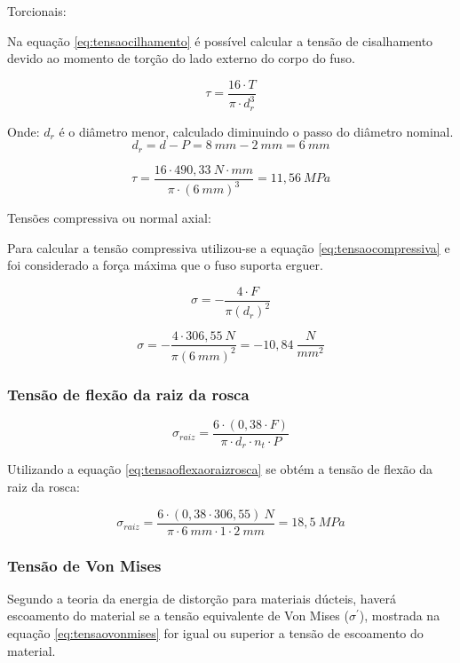 Torcionais:

Na equação \ref{eq:tensaocilhamento} é possível calcular a tensão de cisalhamento devido 
ao momento de torção do lado externo do corpo do fuso. 

\begin{equation}\label{eq:tensaocilhamento}
\tau = \frac{16 \cdot T}{\pi \cdot d_{r}^{3}}
\end{equation}

Onde:
$d_{r}$ é o diâmetro menor, calculado diminuindo o passo do diâmetro nominal.
$$d_{r} = d - P = 8~mm - 2~mm = 6~mm$$

$$\tau = \frac{16 \cdot 490,33~N \cdot mm}{\pi \cdot (6~mm)^{3}} = 11,56~MPa$$

Tensões compressiva ou normal axial:

Para calcular a tensão compressiva utilizou-se a equação \ref{eq:tensaocompressiva} e 
foi considerado a força máxima que o fuso suporta erguer.

\begin{equation}\label{eq:tensaocompressiva}
\sigma = - \frac{4 \cdot F}{ \pi (d_{r})^{2}}
\end{equation}

$$\sigma = - \frac{4 \cdot 306,55~N}{ \pi (6~mm)^{2}} = -10,84~\frac{N}{mm^{2}}$$

\subsubsection{Tensão de flexão da raiz da rosca}

\begin{equation}\label{eq:tensaoflexaoraizrosca}
\sigma_{raiz} = \frac{6 \cdot (0,38 \cdot F)}{\pi \cdot d_{r} \cdot n_{t} \cdot P}
\end{equation}

Utilizando a equação \ref{eq:tensaoflexaoraizrosca} se obtém a tensão de flexão da raiz da rosca:

$$\sigma_{raiz} = \frac{6 \cdot (0,38 \cdot 306,55)~N}{\pi \cdot 6~mm \cdot 1 \cdot 2~mm} = 18,5~MPa$$

\subsubsection{Tensão de Von Mises}

Segundo a teoria da energia de distorção para materiais dúcteis, haverá escoamento do material 
se a tensão equivalente de Von Mises ($\sigma^{'}$), mostrada na equação \ref{eq:tensaovonmises} 
for igual ou superior a tensão de escoamento do material.

